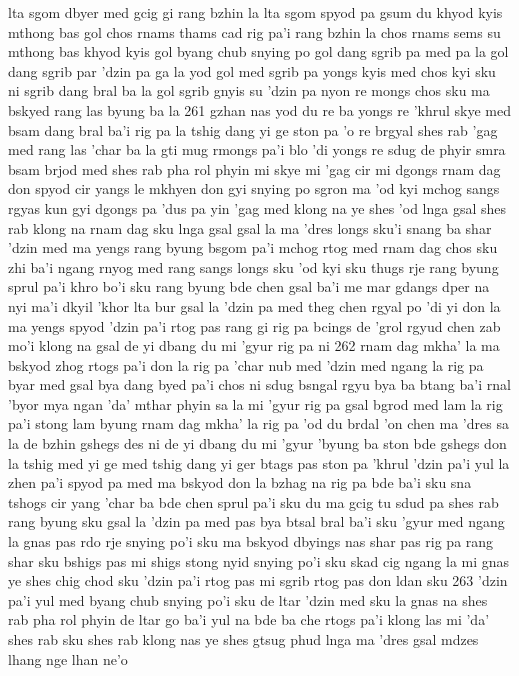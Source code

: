 lta sgom dbyer med gcig gi rang bzhin la
lta sgom spyod pa gsum du khyod kyis mthong bas gol
chos rnams thams cad rig pa'i rang bzhin la
chos rnams sems su mthong bas khyod kyis gol
byang chub snying po gol dang sgrib pa med pa la
gol dang sgrib par 'dzin pa ga la yod
gol med sgrib pa yongs kyis med
chos kyi sku ni sgrib dang bral ba la
gol sgrib gnyis su 'dzin pa nyon re mongs
chos sku ma bskyed rang las byung ba la
261
gzhan nas yod du re ba yongs re 'khrul
skye med bsam dang bral ba'i rig pa la
tshig dang yi ge ston pa 'o re brgyal
shes rab 'gag med rang las 'char ba la
gti mug rmongs pa'i blo 'di yongs re sdug
de phyir smra bsam brjod med shes rab pha rol phyin
mi skye mi 'gag cir mi dgongs
rnam dag don spyod cir yangs le mkhyen
don gyi snying po sgron ma 'od kyi mchog
sangs rgyas kun gyi dgongs pa 'dus pa yin
'gag med klong na ye shes 'od lnga gsal
shes rab klong na rnam dag sku lnga gsal
gsal la ma 'dres longs sku'i snang ba shar
'dzin med ma yengs rang byung bsgom pa'i mchog
rtog med rnam dag chos sku zhi ba'i ngang
rnyog med rang sangs longs sku 'od kyi sku
thugs rje rang byung sprul pa'i khro bo'i sku
rang byung bde chen gsal ba'i me mar gdangs
dper na nyi ma'i dkyil 'khor lta bur gsal la 'dzin pa med
theg chen rgyal po 'di yi don la ma yengs spyod
'dzin pa'i rtog pas rang gi rig pa bcings
de 'grol rgyud chen zab mo'i klong na gsal
de yi dbang du mi 'gyur rig pa ni
262
rnam dag mkha' la ma bskyod zhog
rtogs pa'i don la rig pa 'char nub med
'dzin med ngang la rig pa byar med gsal
bya dang byed pa'i chos ni sdug bsngal rgyu
bya ba btang ba'i rnal 'byor mya ngan 'da'
mthar phyin sa la mi 'gyur rig pa gsal
bgrod med lam la rig pa'i stong lam byung
rnam dag mkha' la rig pa 'od du brdal
'on chen ma 'dres sa la de bzhin gshegs
des ni de yi dbang du mi 'gyur 'byung ba ston
bde gshegs don la tshig med yi ge med
tshig dang yi ger btags pas ston pa 'khrul
'dzin pa'i yul la zhen pa'i spyod pa med
ma bskyod don la bzhag na rig pa bde ba'i sku
sna tshogs cir yang 'char ba bde chen sprul pa'i sku
du ma gcig tu sdud pa shes rab rang byung sku
gsal la 'dzin pa med pas bya btsal bral ba'i sku
'gyur med ngang la gnas pas rdo rje snying po'i sku
ma bskyod dbyings nas shar pas rig pa rang shar sku
bshigs pas mi shigs stong nyid snying po'i sku
skad cig ngang la mi gnas ye shes chig chod sku
'dzin pa'i rtog pas mi sgrib rtog pas don ldan sku
263
'dzin pa'i yul med byang chub snying po'i sku
de ltar 'dzin med sku la gnas na shes rab pha rol phyin
de ltar go ba'i yul na bde ba che
rtogs pa'i klong las mi 'da' shes rab sku
shes rab klong nas ye shes gtsug phud lnga
ma 'dres gsal mdzes lhang nge lhan ne'o
